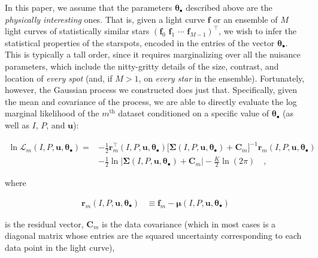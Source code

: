 \documentclass[modern,linenumbers]{aastex62}
\begin{document}
In this paper, we assume that the parameters $\pmb{\theta}_\bullet$
described above are the \emph{physically interesting} ones. That is,
given a light curve $\mathbf{f}$ or an ensemble of $M$ light curves of
statistically similar stars
$\left( \mathbf{f}_0 \,\, \mathbf{f}_1 \,\, \cdots \,\,  \mathbf{f}_{M-1} \right)^\top$,
we wish to infer the statistical properties of the starspots, encoded in
the entries of the vector $\pmb{\theta}_\bullet$.
%
This is typically a tall order, since it requires marginalizing over all
the nuisance parameters, which include the nitty-gritty details of the
size, contrast, and location of \emph{every spot} (and, if $M > 1$, on \emph{every star}
in the ensemble). Fortunately, however, the Gaussian process we constructed
does just that. Specifically, given the mean and covariance of the process,
we are able to directly evaluate the log marginal likelihood of the $m^\mathrm{th}$
dataset
conditioned on a specific value of $\pmb{\theta}_\bullet$ (as well as $I$,
$P$, and $\mathbf{u}$):
%
\begin{linenomath}\begin{align}
        \label{eq:log-like}
        \ln \mathcal{L}_m\left(I, P, \mathbf{u}, \pmb{\theta}_\bullet\right)
        =
         & -\frac{1}{2}
        \mathbf{r}_m^\top\left(I, P, \mathbf{u}, \pmb{\theta}_\bullet\right)
        \big[
            \pmb{\Sigma}\left(I, P, \mathbf{u}, \pmb{\theta}_\bullet\right)
            +
            \mathbf{C}_m
            \big]^{-1}
        \mathbf{r}_m\left(I, P, \mathbf{u}, \pmb{\theta}_\bullet\right)
        \nonumber       \\[0.75em]
         & -
        \frac{1}{2}
        \ln \Big|
        \pmb{\Sigma}\left(I, P, \mathbf{u}, \pmb{\theta}_\bullet\right)
        +
        \mathbf{C}_m
        \Big|
        -
        \frac{K}{2}
        \ln \left( 2 \pi \right)
        \quad,
    \end{align}\end{linenomath}
%
where
%
\begin{linenomath}\begin{align}
        \mathbf{r}_m\left(I, P, \mathbf{u}, \pmb{\theta}_\bullet\right)
         & \equiv
        \mathbf{f}_m - \pmb{\mu}\left(I, P, \mathbf{u}, \pmb{\theta}_\bullet\right)
    \end{align}\end{linenomath}
%
is the residual vector,
%
$\mathbf{C}_m$ is the data covariance
(which in most cases is a diagonal matrix whose entries
are the squared uncertainty corresponding to each data point in the light curve),
\end{document}
